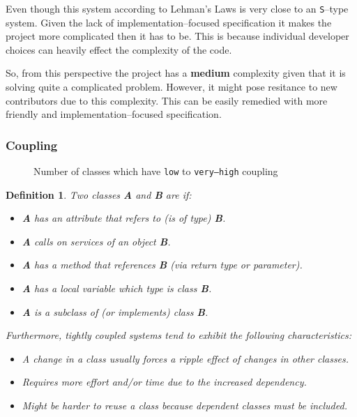 \documentclass[12pt]{article}
\DeclareRobustCommand{\ul}[1]{%
	\uline{\phantom{#1}}%
	\llap{\contour{white}{#1}}%
}
\newtheorem*{definition}{Definition}
\begin{document}
Even though this system according to Lehman's Laws is very close
to an \texttt{S}--type system. Given the lack of
implementation--focused specification it makes the project more
complicated then it has to be. This is because individual
developer choices can heavily effect the complexity of the code.

So, from this perspective the project has a \textbf{medium}
complexity given that it is solving quite a complicated problem.
However, it might pose resitance to new contributors due to this
complexity. This can be easily remedied with more friendly and
implementation--focused specification.

\subsubsection{Coupling}

\begin{figure}[H]
    \centering
    \caption{Number of classes which have \texttt{low} to
    \texttt{very--high} coupling}
    \label{coupling-diag}
\end{figure}

\begin{definition}
    Two classes \textbf{A} and \textbf{B} are \ul{coupled} if:
    \begin{itemize}
        \item \textbf{A} has an attribute that refers to (is of type)
            \textbf{B}.
        \item \textbf{A} calls on services of an object
            \textbf{B}.
        \item \textbf{A} has a method that references \textbf{B}
            (via return type or parameter).
        \item \textbf{A} has a local variable which type is
            class \textbf{B}.
        \item \textbf{A} is a subclass of (or implements) class
            \textbf{B}.
    \end{itemize}

    Furthermore, tightly coupled systems tend to exhibit the
    following characteristics:
    \begin{itemize}
        \item A change in a class usually forces a ripple effect
            of changes in other classes.
        \item Requires more effort and/or time due to the
            increased dependency.
        \item Might be harder to reuse a class because dependent
            classes must be included.
    \end{itemize}
\end{definition}
\end{document}
